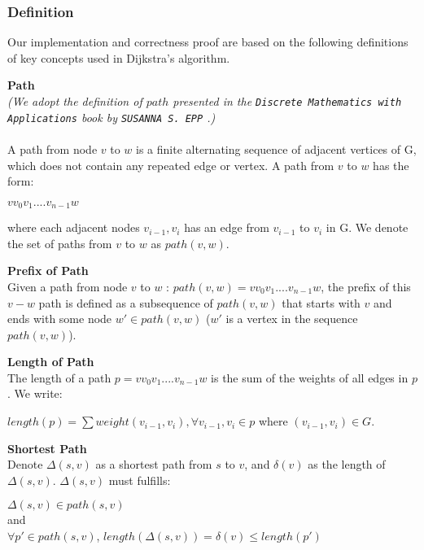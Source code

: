 
\subsubsection{Definition}
Our implementation and correctness proof are based on the following definitions of key concepts used in Dijkstra's algorithm. 
\theoremstyle{definition}
\begin{definition}\textbf{Path}\\
\textit{(We adopt the definition of $path$ presented in the \texttt{Discrete Mathematics with Applications} book by \texttt{SUSANNA S. EPP} \cite{discrete}.)}
\\\\
A path from node $v$ to $w$ is a finite alternating sequence of adjacent vertices of G, which does not contain any repeated edge or vertex. A path from $v$ to $w$ has the form: 
\begin{center}
 $vv_0v_1....v_{n-1}w$ 
\end{center}
where each adjacent nodes $v_{i-1}, v_i$ has an edge from $v_{i-1}$ to $v_i$ in G. We denote the set of paths from $v$ to $w$ as $path(v, w)$.
\end{definition}
\tab
\begin{definition}\textbf{Prefix of Path}\\
Given a path from node $v$ to $w$ : $path(v, w) = vv_0v_1....v_{n-1}w$, the prefix of this $v-w$ path is defined as a subsequence of $path(v, w)$ that starts with $v$ and ends with some node $w' \in path(v, w)$ ($w'$ is a vertex in the sequence $path(v, w)$). 
\end{definition}
\tab
\begin{definition}\textbf{Length of Path} \\
The length of a path $p = vv_0v_1....v_{n-1}w$ is the sum of the weights of all edges in $p$. We write: 
\begin{center}
  $length(p) = \sum weight(v_{i-1}, v_i), \forall v_{i-1}, v_i \in p$ where $(v_{i-1}, v_i) \in G$. 
\end{center} 
\end{definition}
\tab
\begin{definition}\textbf{Shortest Path}\\
Denote $\Delta(s, v)$ as a shortest path from $s$ to $v$, and $\delta(v)$ as the length of $\Delta(s, v)$. $\Delta(s, v)$ must fulfills: 
\begin{center}
$\Delta(s, v) \in path(s, v)$ 
\\
and 
\\
$\forall p' \in path(s, v)$, $length(\Delta(s, v)) = \delta(v) \leq length(p')$
\end{center}
\end{definition}